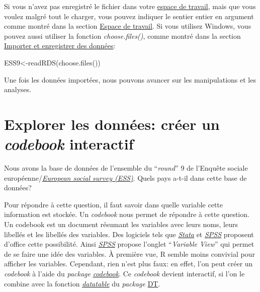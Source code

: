 \documentclass[
]{book}
\newenvironment{Shaded}{\begin{snugshade}}{\end{snugshade}}
\newcommand{\FunctionTok}[1]{\textcolor[rgb]{0.00,0.00,0.00}{#1}}
\newcommand{\NormalTok}[1]{#1}
\newcommand{\OtherTok}[1]{\textcolor[rgb]{0.56,0.35,0.01}{#1}}
\begin{document}
Si vous n'avez pas enregistré le fichier dans votre \protect\hyperlink{working_directory}{espace de travail}, mais que vous voulez malgré tout le charger, vous pouvez indiquer le sentier entier en argument comme montré dans la section \protect\hyperlink{working_directory}{Espace de travail}. Si vous utilisez Windows, vous pouvez aussi utiliser la fonction \emph{choose.files()}, comme montré dans la section \protect\hyperlink{import_donnees}{Importer et enregistrer des données}:

\begin{Shaded}
\begin{Highlighting}[]
\NormalTok{ESS9}\OtherTok{\textless{}{-}}\FunctionTok{readRDS}\NormalTok{(}\FunctionTok{choose.files}\NormalTok{())}
\end{Highlighting}
\end{Shaded}

Une fois les données importées, nous pouvons avancer sur les manipulations et les analyses.

\hypertarget{explorer-les-donnuxe9es-cruxe9er-un-codebook-interactif}{%
\section{\texorpdfstring{Explorer les données: créer un \emph{codebook} interactif}{Explorer les données: créer un codebook interactif}}\label{explorer-les-donnuxe9es-cruxe9er-un-codebook-interactif}}

Nous avons la base de données de l'ensemble du ``\emph{round}'' 9 de l'Enquête sociale européenne/\href{https://www.europeansocialsurvey.org/}{\emph{European social survey (ESS)}}. Quels pays a-t-il dans cette base de données?

Pour répondre à cette question, il faut savoir dans quelle variable cette information est stockée. Un \emph{codebook} nous permet de répondre à cette question. Un codebook est un document résumant les variables avec leurs noms, leurs libellés et les libellés des variables. Des logiciels tels que \href{https://www.stata.com/}{\emph{Stata}} et \href{https://www.ibm.com/fr-fr/products/spss-statistics}{\emph{SPSS}} proposent d'office cette possibilité. Ainsi \href{https://www.ibm.com/fr-fr/products/spss-statistics}{\emph{SPSS}} propose l'onglet ``\emph{Variable View}'' qui permet de se faire une idée des variables. À première vue, R semble moins convivial pour afficher les variables. Cependant, rien n'est plus faux: en effet, l'on peut créer un \emph{codebook} à l'aide du \emph{package} \href{https://rubenarslan.github.io/codebook/index.html}{\emph{codebook}}. Ce \emph{codebook} devient interactif, si l'on le combine avec la fonction \href{https://www.rdocumentation.org/packages/DT/versions/0.26/topics/datatable}{\emph{datatable}} du \emph{package} \href{https://rstudio.github.io/DT/}{DT}.
\end{document}
